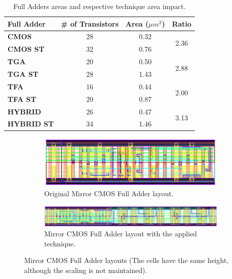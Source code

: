 \documentclass[ecp,tc, english]{iiufrgs}
\begin{document}
\begin{table}[H]
\centering
\caption{Full Adders areas and respective technique area impact.}
\label{penalties}
\begin{tabular}{lccc}
\hline
\textbf{Full Adder} & \multicolumn{1}{l}{\textbf{\# of Transistors}} & \textbf{Area (${\mu m}^2$)} & \textbf{Ratio}        \\ \hline
\textbf{CMOS}       & 28                                              & 0.32             & \multirow{2}{*}{2.36} \\ \cline{1-3}
\textbf{CMOS ST}    & 32                                              & 0.76             &                       \\ \hline
\textbf{TGA}        & 20                                              & 0.50             & \multirow{2}{*}{2.88} \\ \cline{1-3}
\textbf{TGA ST}     & 28                                              & 1.43             &                       \\ \hline
\textbf{TFA}        & 16                                              & 0.44             & \multirow{2}{*}{2.00} \\ \cline{1-3}
\textbf{TFA ST}     & 20                                              & 0.87             &                       \\ \hline
\textbf{HYBRID}     & 26                                              & 0.47             & \multirow{2}{*}{3.13} \\ \cline{1-3}
\textbf{HYBRID ST}  & 34                                              & 1.46             &                       \\ \hline
\end{tabular}
\end{table}

\begin{figure}[H]
  \centering
  \begin{subfigure}{\linewidth}
    \centering
    \includegraphics[width=\linewidth]{CMOS.png}
    \caption{Original Mirror CMOS Full Adder layout.}
  \end{subfigure}

  \begin{subfigure}{\linewidth}
    \centering
    \includegraphics[width=\linewidth]{CMOSST.png}
    \caption{Mirror CMOS Full Adder layout with the applied technique.}
  \end{subfigure}  
  \caption{Mirror CMOS Full Adder layouts (The cells have the same height, although the scaling is not maintained).}
 \label{CMOS}
\end{figure}
\end{document}
